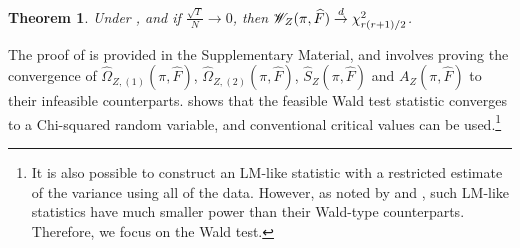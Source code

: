 \documentclass[12pt]{article}
\newtheorem{theorem}{Theorem}[section]
\newcommand*{\tran}{\intercal}
\theoremstyle{plain}
\numberwithin{equation}{section}
\begin{document}
\begin{theorem}
\label{thm:6:Z_Wald_consistency}
Under  , and if $\frac{\sqrt{T}}{N} \to 0$, then $\mathscr{W}_Z(\pi, \widehat{F}) \overset{d}{\to} \chi^2_{r(r + 1)/2}$.
\end{theorem}
The proof of  is provided in the Supplementary Material, and involves proving the convergence of $\widehat{\Omega}_{Z, (1)}(\pi, \widehat{F})$, $\widehat{\Omega}_{Z, (2)}(\pi, \widehat{F})$, $\widehat{S}_Z(\pi, \widehat{F})$ and $A_Z(\pi, \widehat{F})$ to their infeasible counterparts. 
 shows that the feasible Wald test statistic converges to a Chi-squared random variable, and conventional critical values can be used.\footnote{It is also possible to construct an LM-like statistic with a restricted estimate of the variance using all of the data. However, as noted by \textcite{chen_detecting_2014} and \textcite{han_tests_2015}, such LM-like statistics have much smaller power than their Wald-type counterparts. Therefore, we focus on the Wald test.}
\end{document}
